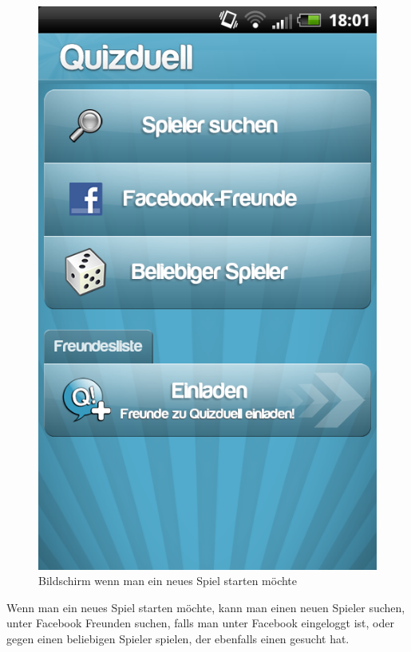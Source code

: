 \documentclass[fontsize=12pt,paper=a4,twoside]{scrartcl}
\begin{document}
\begin{figure}[H]
\centering
\includegraphics[scale=0.5]{Bilder/neuesspiel.png}
\caption{Bildschirm wenn man ein neues Spiel starten möchte}
\end{figure}

Wenn man ein neues Spiel starten möchte, kann man einen neuen Spieler suchen, unter Facebook Freunden suchen, falls man unter Facebook eingeloggt ist, oder gegen einen beliebigen Spieler spielen, der ebenfalls einen gesucht hat. 
\end{document}
